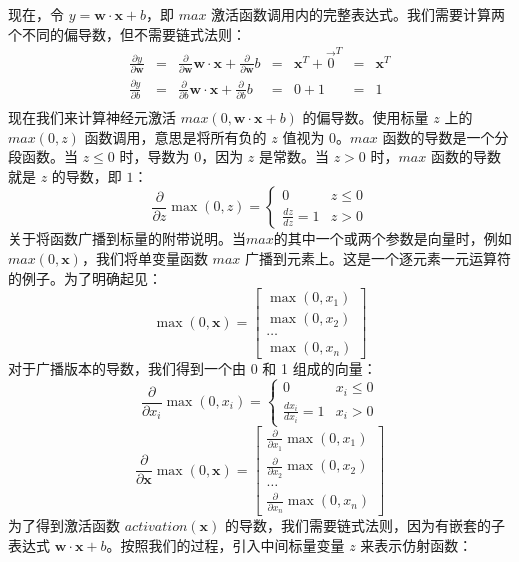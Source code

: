 \documentclass[11pt]{article}
\begin{document}
现在，令 $y = \mathbf{w} \cdot \mathbf{x} + b$，即 $max$ 激活函数调用内的完整表达式。我们需要计算两个不同的偏导数，但不需要链式法则：
\[
\begin{array}{lllllllll}
 \frac{\partial y}{\partial \mathbf{w}} &=& \frac{\partial }{\partial \mathbf{w}} \mathbf{w} \cdot \mathbf{x} + \frac{\partial }{\partial \mathbf{w}} b &=& \mathbf{x}^T + \vec{0}^T &=& \mathbf{x}^T \\
 \frac{\partial y}{\partial b} &=& \frac{\partial }{\partial b} \mathbf{w} \cdot \mathbf{x} + \frac{\partial }{\partial b} b &=& 0 + 1 &=& 1 \\
\end{array}
\]
现在我们来计算神经元激活 $max(0, \mathbf{w} \cdot \mathbf{x} + b)$ 的偏导数。使用标量 $z$ 上的 $max(0,z)$ 函数调用，意思是将所有负的 $z$ 值视为 0。$max$ 函数的导数是一个分段函数。当 $z \leq 0$ 时，导数为 0，因为 $z$ 是常数。当 $z > 0$ 时，$max$ 函数的导数就是 $z$ 的导数，即 $1$：
\[ \frac{\partial}{\partial z} \max(0,z) =
	\begin{cases}
	0 & z \leq 0 \\
	\frac{dz}{dz}=1 & z > 0
	\end{cases}
\]
关于将函数广播到标量的附带说明。当$max$的其中一个或两个参数是向量时，例如 $max(0,\mathbf{x})$，我们将单变量函数 $max$ 广播到元素上。这是一个逐元素一元运算符的例子。为了明确起见：
\[
\max(0,\mathbf{x}) = \begin{bmatrix}
 \max(0,x_1) \\
 \max(0,x_2) \\
 \ldots \\
 \max(0,x_n)
\end{bmatrix}
\]
对于广播版本的导数，我们得到一个由 0 和 1 组成的向量：
\[
\frac{\partial}{\partial x_i} \max(0,x_i) =
	\begin{cases}
	0 & x_i \leq 0 \\
	\frac{dx_i}{dx_i}=1 & x_i > 0
	\end{cases}
\]
\[\frac{\partial}{\partial \mathbf{x}} \max(0,\mathbf{x}) =
\begin{bmatrix}
	\frac{\partial}{\partial x_1} \max(0,x_1) \\
	\frac{\partial}{\partial x_2} \max(0,x_2) \\
	\ldots \\
    \frac{\partial}{\partial x_n} \max(0,x_n)
\end{bmatrix}
\]
为了得到激活函数 $activation(\mathbf{x})$ 的导数，我们需要链式法则，因为有嵌套的子表达式 $\mathbf{w} \cdot \mathbf{x} + b$。按照我们的过程，引入中间标量变量 $z$ 来表示仿射函数：
\end{document}
